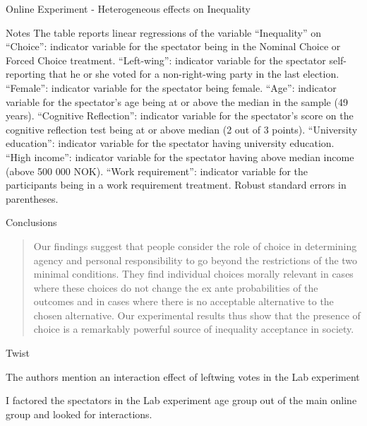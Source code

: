 \documentclass{beamer}
\begin{document}
\begin{frame}{Online Experiment - Heterogeneous effects on Inequality}

	\begin{block}{Notes}
		The table reports linear regressions of the variable “Inequality” on “Choice”: indicator variable for
		the spectator being in the Nominal Choice or Forced Choice treatment. “Left-wing”: indicator variable for
		the spectator self-reporting that he or she voted for a non-right-wing party in the last election. “Female”:
		indicator variable for the spectator being female. “Age”: indicator variable for the spectator’s age being at
		or above the median in the sample (49 years). “Cognitive Reflection”: indicator variable for the spectator’s
		score on the cognitive reflection test being at or above median (2 out of 3 points). “University education”:
		indicator variable for the spectator having university education. “High income”: indicator variable for the
		spectator having above median income (above 500 000 NOK). “Work requirement”: indicator variable for
		the participants being in a work requirement treatment. Robust standard errors in parentheses. %
	\end{block}
\end{frame}

	\begin{frame}{Conclusions}

	\begin{block}

		\begin{quote}
			Our findings suggest that people consider the role of choice in determining agency
			and personal responsibility to go beyond the restrictions of the two minimal conditions.
			They find individual choices morally relevant in cases where these choices do
			not change the ex ante probabilities of the outcomes and in cases where there is no
			acceptable alternative to the chosen alternative. Our experimental results thus show
			that the presence of choice is a remarkably powerful source of inequality acceptance
			in society.
		\end{quote}

	\end{block}

\end{frame}



	\begin{frame}{Twist}

	\begin{block}

			The authors mention an interaction effect of leftwing votes in the Lab experiment

			I factored the spectators in the Lab experiment age group out of the main online group and looked for 	interactions.


	\end{block}

	\end{frame}
\end{document}
